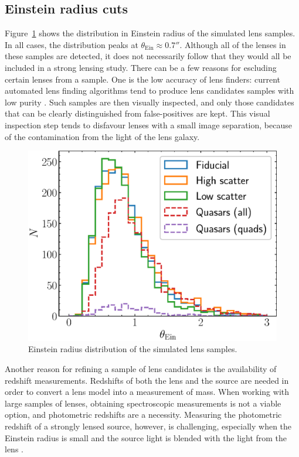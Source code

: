 \documentclass{aa}
\def\tein{\theta_{\mathrm{Ein}}}
\def\Fref#1{Figure~\ref{#1}\xspace}
\begin{document}
\subsection{Einstein radius cuts}

\Fref{fig:teinhist} shows the distribution in Einstein radius of the simulated lens samples.
In all cases, the distribution peaks at $\tein\approx0.7''$.
Although all of the lenses in these samples are detected, it does not necessarily follow that they would all be included in a strong lensing study.
There can be a few reasons for escluding certain lenses from a sample. 
One is the low accuracy of lens finders: current automated lens finding algorithms tend to produce lens candidates samples with low purity \citep[see e.g.][]{Son++18a,Pet++19,Sav++22}. Such samples are then visually inspected, and only those candidates that can be clearly distinguished from false-positives are kept. This visual inspection step tends to disfavour lenses with a small image separation, because of the contamination from the light of the lens galaxy.
\begin{figure}
\includegraphics[width=\columnwidth]{tein_hist.eps}
\caption{
Einstein radius distribution of the simulated lens samples.
\label{fig:teinhist}
}
\end{figure}

Another reason for refining a sample of lens candidates is the availability of redshift measurements. Redshifts of both the lens and the source are needed in order to convert a lens model into a measurement of mass. When working with large samples of lenses, obtaining spectroscopic measurements is not a viable option, and photometric redshifts are a necessity. Measuring the photometric redshift of a strongly lensed source, however, is challenging, especially when the Einstein radius is small and the source light is blended with the light from the lens \citep{Lan++22}.
\end{document}
